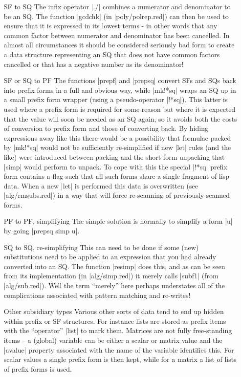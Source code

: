 \documentclass[12pt,twoside,openright]{memoir}
\begin{document}
\begin{itemize}
\item[SF to SQ] The infix operator |./| combines a numerator and
denominator to be an SQ. The function |gcdchk| (in |poly/polrep.red|)
can then be used to ensure that it is expressed in its lowest terms -
in other words that any common factor between numerator and denominator
has been cancelled. In almost all circumstances it should be considered
seriously bad form to create a data structure representing an SQ that does
not have common factors cancelled or that has a negative number as its
denominator!
\item[SF or SQ to PF] The functions |prepf| and |prepsq| convert SFs and
SQs back into prefix forms in a full and obvious way, while |mk!*sq| wraps
an SQ up in a small prefix form wrapper (using a pseudo-operator |!*sq|). This
latter is used where a prefix form is required for some reason but where it
is expected that the value will soon be needed as an SQ again, so it avoids
both the costs of conversion to prefix form and those of converting back.
By hiding expressions away like this there would be a possibility that
formulae packed by |mk!*sq| would not be sufficiently re-simplified if new
|let| rules (and the like) were introduced between packing and the short
form unpacking that |simp| would perform to unpack. To cope with this the
special |!*sq| prefix form contains a flag such that all such forms share
a single fragment of lisp data. When a new |let| is performed this data is
overwritten (see |alg/rmsubs.red|) in a way that will force re-scanning of
previously scanned forms.
\item[PF to PF, simplifying] The simple solution is normally to simplify
a form |u| by going |prepsq simp u|.
\item[SQ to SQ, re-simplifying] This can need to be done if some (new)
substitutions need to be applied to an expression that you had already
converted into an SQ. The function |resimp| does this, and as can be seen
from its implementation (in |alg/simp.red|) it merely calls |subf1| (from
|alg/sub.red|). Well the term ``merely'' here perhaps understates all of the
complications associated with pattern matching and re-writes!
\item[Other subsidiary types] Various other sorts of data tend to end up
hidden within prefix or SF structures. For instance lists are stored
as prefix items with the ``operator'' |list| to mark them. Matrices are
not fully free-standing items -- a (global) variable can be either a scalar
or matrix value and the |avalue| property associated with the name of the
variable identifies this. For scalar values a single prefix form is then
kept, while for a matrix a list of lists of prefix forms is used.


\end{itemize}
\end{document}
